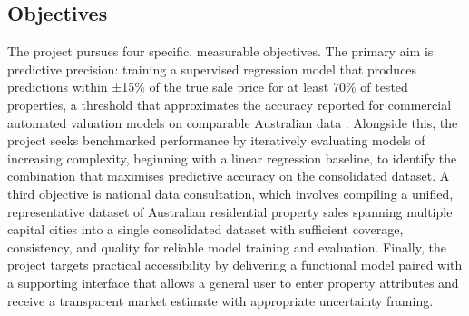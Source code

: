 \documentclass[a4paper,12pt]{article}
\begin{document}
\subsection{Objectives}
The project pursues four specific, measurable objectives. The primary aim is predictive precision: training a supervised regression model that produces predictions within ±15\% of the true sale price for at least 70\% of tested properties, a threshold that approximates the accuracy reported for commercial automated valuation models on comparable Australian data \cite{antipov2024avm}. Alongside this, the project seeks benchmarked performance by iteratively evaluating models of increasing complexity, beginning with a linear regression baseline, to identify the combination that maximises predictive accuracy on the consolidated dataset. A third objective is national data consultation, which involves compiling a unified, representative dataset of Australian residential property sales spanning multiple capital cities into a single consolidated dataset with sufficient coverage, consistency, and quality for reliable model training and evaluation. Finally, the project targets practical accessibility by delivering a functional model paired with a supporting interface that allows a general user to enter property attributes and receive a transparent market estimate with appropriate uncertainty framing.
\end{document}
